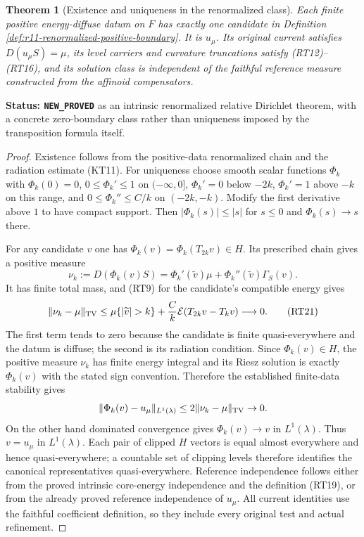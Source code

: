 \documentclass[11pt,a4paper]{article}
\numberwithin{equation}{section}
\newtheorem{theorem}{Theorem}[section]
\theoremstyle{definition}
\theoremstyle{remark}
\begin{document}
\begin{theorem}[Existence and uniqueness in the renormalized class]
\label{thm:r11-positive-renormalized-Dirichlet}
Each finite positive energy-diffuse datum on $F$ has exactly one
candidate in Definition
\ref{def:r11-renormalized-positive-boundary}.  It is $u_\mu$.
Its original current satisfies $D(u_\mu S)=\mu$, its level
carriers and curvature truncations satisfy (RT12)--(RT16), and
its solution class is independent of the faithful reference
measure constructed from the affinoid compensators.
\end{theorem}

\noindent\textbf{Status: \texttt{NEW\_PROVED}} as an intrinsic
renormalized relative Dirichlet theorem, with a concrete
zero-boundary class rather than uniqueness imposed by the
transposition formula itself.

\begin{proof}
Existence follows from the positive-data renormalized chain
and the radiation estimate (KT11).  For uniqueness choose
smooth scalar functions $\Phi_k$ with $\Phi_k(0)=0$,
$0\le\Phi_k'\le1$ on $(-\infty,0]$,
$\Phi_k'=0$ below $-2k$, $\Phi_k'=1$ above $-k$ on this
range, and
$0\le\Phi_k''\le C/k$ on $(-2k,-k)$.
Modify the first derivative above $1$ to have compact support.
Then $|\Phi_k(s)|\le|s|$ for $s\le0$ and
$\Phi_k(s)\to s$ there.

For any candidate $v$ one has
$\Phi_k(v)=\Phi_k(T_{2k}v)\in H$.
Its prescribed chain gives a positive measure
\[
 \nu_k:=D(\Phi_k(v)S)
       =\Phi_k'(\widetilde v)\mu
                           +\Phi_k''(\widetilde v)\Gamma_S(v).
 \tag{RT20}
\]
It has finite total mass, and (RT9) for the candidate's compatible
energy gives
\[
 \|\nu_k-\mu\|_{\rm TV}
 \le\mu\{|\widetilde v|>k\}
       +\frac{C}{k}\mathcal E(T_{2k}v-T_kv)
                                         \longrightarrow0.
 \tag{RT21}
\]
The first term tends to zero because the candidate is finite
quasi-everywhere and the datum is diffuse; the second is its
radiation condition.  Since $\Phi_k(v)\in H$, the positive
measure $\nu_k$ has finite energy integral and its Riesz
solution is exactly $\Phi_k(v)$ with the stated sign convention.
Therefore the established finite-data stability gives
\[
                 \|\Phi_k(v)-u_\mu\|_{L^1(\lambda)}
                                  \le2\|\nu_k-\mu\|_{\rm TV}\to0.
\]
On the other hand dominated convergence gives
$\Phi_k(v)\to v$ in $L^1(\lambda)$.  Thus $v=u_\mu$ in $L^1(\lambda)$.  Each pair of clipped
$H$ vectors is equal almost everywhere and hence quasi-everywhere;
a countable set of clipping levels therefore identifies the
canonical representatives quasi-everywhere.
Reference independence follows either from the proved intrinsic
core-energy independence and the definition (RT19), or from
the already proved reference independence of $u_\mu$.
All current identities use the faithful coefficient definition,
so they include every original test and actual refinement.
\end{proof}
\end{document}
